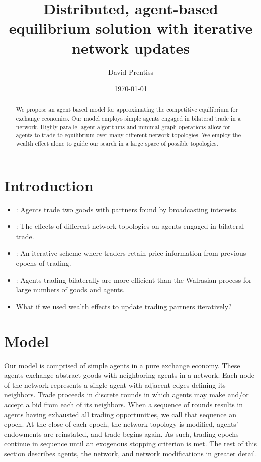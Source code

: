 \documentclass[smallextended]{svjour3}
\begin{document}
\title{Distributed, agent-based equilibrium solution with iterative network
updates}
\author{David Prentiss}
\date{\today}
\maketitle
\begin{abstract}
  We propose an agent based model for approximating the competitive
  equilibrium for exchange economies. Our model employs simple agents
  engaged in bilateral trade in a network. Highly parallel agent algorithms and
  minimal graph operations allow for agents to trade to equilibrium over many
  different network topologies. We employ the wealth effect alone to guide our
  search in a large space of possible topologies.
\end{abstract}
\section{Introduction}
  \begin{itemize}
  \item \cite{albin1992decentralized}: Agents trade two goods with partners found by
    broadcasting interests.
  \item \cite{wilhite2001bilateral}: The effects of different network
  topologies on agents engaged in bilateral trade.
  \item \cite{sunder2002simple}: An iterative scheme where traders retain
  price information from previous epochs of trading.
  \item \cite{axtell2005complexity}: Agents trading bilaterally are more
    efficient than the Walrasian process for large numbers of goods and agents.
  \item What if we used wealth effects to update trading partners iteratively?
  \end{itemize}
\section{Model}
Our model is comprised of simple agents in a pure exchange economy.
These agents exchange abstract goods with neighboring agents in a network.
Each node of the network represents a single agent with adjacent edges defining
its neighbors.
Trade proceeds in discrete rounds in which agents may make and/or accept a bid
from each of its neighbors.
When a sequence of rounds results in agents having exhausted all trading
opportunities, we call that sequence an epoch.
At the close of each epoch, the network topology is modified, agents'
endowments are reinstated, and trade begins again.
As such, trading epochs continue in sequence until an exogenous stopping
criterion is met.
The rest of this section describes agents, the network, and network
modifications in greater detail.
\end{document}
